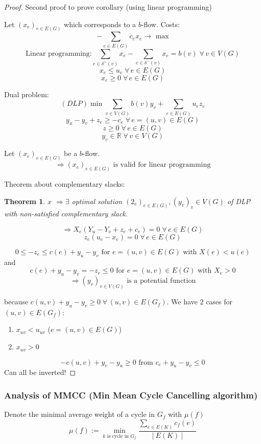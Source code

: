\documentclass{article}
\newtheorem{theorem}{Theorem}
\newcommand{\card}[1]{\left|\:\!#1\:\!\right|}
\newcommand{\fall}{\;\forall\,}
\begin{document}
\begin{proof}
  Second proof to prove corollary (using linear programming)

  Let $(x_e)_{e \in E(G)}$ which corresponds to a $b$-flow. Costs:
  \[
    -\sum_{e \in E(G)} c_e x_e \rightarrow \text{ max}
  \] \[
    \text{Linear programming:}
      \sum_{e \in \delta^+(v)} x_e - \sum_{e \in \delta^-(v)} x_e = b(v) \fall v \in V(G)
  \] \[
    x_e \leq u_e \fall e \in E(G)
  \] \[
    x_e \geq 0 \fall e \in E(G)
  \]

  Dual problem:
  \[
    (DLP) \min{\sum_{v \in V(G)} b(v) y_v + \sum_{e \in E(G)} u_e z_e}
  \] \[
    y_u - y_v + z_e \geq - c_e \fall e = (u,v) \in E(G)
  \] \[
    z \geq 0 \fall e \in E(G)
  \] \[
    y_v \in \mathbb{R} \fall v \in V(G)
  \]

  Let $(x_e)_{e \in E(G)}$ be a $b$-flow.
  \[ \Rightarrow (x_e)_{e \in E(G)} \text{ is valid for linear programming} \]

  Theorem about complementary slacks:
  \begin{theorem}
    $x$  $\Rightarrow \exists$ optimal solution $(2_e)_{e \in E(G)}, (y_v)_v \in V(G)$
    of DLP with non-satisfied complementary slack.
  \end{theorem}

  \[
    \Rightarrow X_e(Y_u - Y_v + z_e + c_e) = 0 \fall e \in E(G)
  \] \[
    z_e (u_e - x_e) = 0 \fall e \in E(G)
  \]

  \[
    0 \leq -z_e \leq c(e) + y_u - y_v \text{ for } e = (u,v) \in E(G) \text{ with } X(e) < u(e)
  \] and \[
    c(e) + y_u - y_v = -z_e \leq 0 \text{ for } e = (u,v) \in E(G) \text{ with } X_e > 0
  \] \[
    \Rightarrow (y_v)_{v \in V(G)} \text{ is a potential function}
  \]

  because $c(u,v) + y_u - y_v \geq 0 \fall (u,v) \in E(G_f)$.
  We have 2 cases for $(u,v) \in E(G_f)$:
  \begin{enumerate}
    \item $x_{uv} < u_{uv}$ ($e = (u,v) \in E(G)$)
    \item $x_{uv} > 0$
  \end{enumerate}

  \[
    -c(u,v) + y_v - y_u \geq 0 \text{ from } c_e + y_u - y_v \leq 0
  \]
  Can all be inverted!
\end{proof}

\subsubsection[Analysis of MMCC]{Analysis of MMCC (Min Mean Cycle Cancelling algorithm)}
%
Denote the minimal average weight of a cycle in $G_f$ with $\mu(f)$
\[
  \mu(f) := \min_{k \text{ is cycle in } G_f} \frac{\sum_{e \in E(K)} c_f(e)}{\card{E(K)}}
\]
\end{document}
